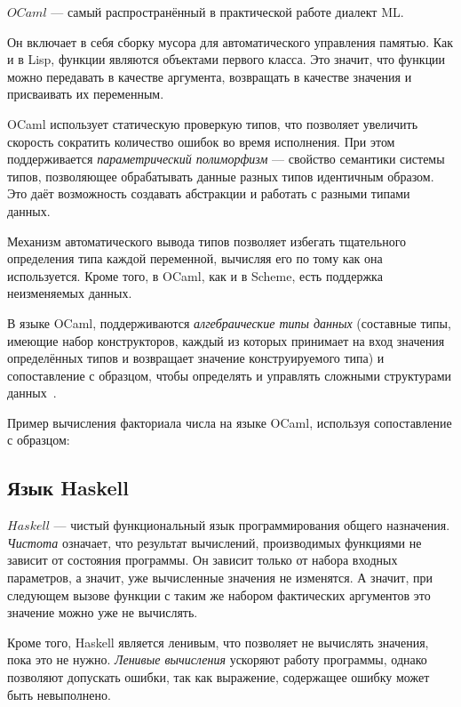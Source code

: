        $OCaml$ --- самый распространённый в практической работе диалект ML.

        Он включает в себя сборку мусора для автоматического управления памятью.
        Как и в Lisp, функции являются объектами первого класса.
        Это значит, что функции можно передавать в качестве аргумента, возвращать в качестве значения и присваивать их переменным.

        OCaml использует статическую проверкую типов, что позволяет увеличить скорость сократить количество ошибок во время исполнения.
        При этом поддерживается \textit{параметрический полиморфизм} --- свойство семантики системы типов, позволяющее обрабатывать данные разных типов идентичным образом.
        Это даёт возможность создавать абстракции и работать с разными типами данных.

        Механизм автоматического вывода типов позволяет избегать тщательного определения типа каждой переменной, вычисляя его по тому как она используется.
        Кроме того, в OCaml, как и в Scheme, есть поддержка неизменяемых данных.

        В языке OCaml, поддерживаются \textit{алгебраические типы данных} (составные типы, имеющие набор конструкторов, каждый из которых принимает на вход значения определённых типов и возвращает значение конструируемого типа) и сопоставление с образцом, чтобы определять и управлять сложными структурами данных~\cite{ocaml}.

        Пример вычисления факториала числа на языке OCaml, используя сопоставление с образцом:

        

    \subsection{Язык Haskell}
        $Haskell$ --- чистый функциональный язык программирования общего назначения.
        \textit{Чистота} означает, что результат вычислений, производимых функциями не зависит от состояния программы.
        Он зависит только от набора входных параметров, а значит, уже вычисленные значения не изменятся.
        А значит, при следующем вызове функции с таким же набором фактических аргументов это значение можно уже не вычислять.

        Кроме того, Haskell является ленивым, что позволяет не вычислять значения, пока это не нужно.
        \textit{Ленивые вычисления} ускоряют работу программы, однако позволяют допускать ошибки, так как выражение, содержащее ошибку может быть невыполнено.

